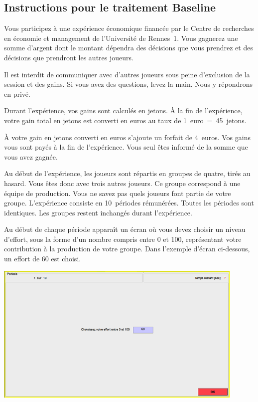 \begin{Article}
\begin{refsection}[Lebourges]
\begin{appendices}
\subsection{Instructions pour le traitement Baseline}

Vous participez à une expérience économique financée par le Centre de
recherches en économie et management de l'Université de Rennes~1. Vous
gagnerez une somme d'argent dont le montant dépendra des décisions que
vous prendrez et des décisions que prendront les autres joueurs.

Il est interdit de communiquer avec d'autres joueurs sous peine
d'exclusion de la session et des gains. Si vous avez des questions,
levez la main. Nous y répondrons en privé.

Durant l'expérience, vos gains sont calculés en jetons. À la fin de
l'expérience, votre gain total en jetons est converti en euros au taux
de 1~euro~=~45~jetons.

À votre gain en jetons converti en euros s'ajoute un forfait de 4~euros.
Vos gains vous sont payés à la fin de l'expérience. Vous seul êtes
informé de la somme que vous avez gagnée.

Au début de l'expérience, les joueurs sont répartis en groupes de
quatre, tirés au hasard. Vous êtes donc avec trois autres joueurs. Ce
groupe correspond à une équipe de production. Vous ne savez pas quels
joueurs font partie de votre groupe. L'expérience consiste en
10~périodes rémunérées. Toutes les périodes sont identiques. Les groupes
restent inchangés durant l'expérience.

Au début de chaque période apparaît un écran où vous devez choisir un
niveau d'effort, sous la forme d'un nombre compris entre 0 et 100,
représentant votre contribution à la production de votre groupe. Dans
l'exemple d'écran ci-dessous, un effort de 60 est choisi.

\vspace{0,2cm}
\includegraphics[width = 0.9\textwidth]{05_fig1-annexII.png}


\end{appendices}
\end{refsection}
\end{Article}
